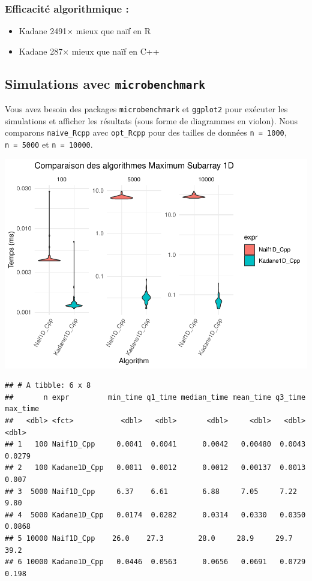 \documentclass[
]{article}
\begin{document}
\subsubsection{Efficacité algorithmique
:}\label{efficacituxe9-algorithmique}

\begin{itemize}
\item
  Kadane 2491× mieux que naïf en R\\
\item
  Kadane 287× mieux que naïf en C++
\end{itemize}

\subsection{\texorpdfstring{Simulations avec
\texttt{microbenchmark}}{Simulations avec microbenchmark}}\label{simulations-avec-microbenchmark}

Vous avez besoin des packages \texttt{microbenchmark} et
\texttt{ggplot2} pour exécuter les simulations et afficher les résultats
(sous forme de diagrammes en violon). Nous comparons
\texttt{naive\_Rcpp} avec \texttt{opt\_Rcpp} pour des tailles de données
\texttt{n\ =\ 1000}, \texttt{n\ =\ 5000} et \texttt{n\ =\ 10000}.

\includegraphics{MaxSubarray1D_files/figure-latex/benchmark-1.pdf}

\begin{verbatim}
## # A tibble: 6 x 8
##       n expr         min_time q1_time median_time mean_time q3_time max_time
##   <dbl> <fct>           <dbl>   <dbl>       <dbl>     <dbl>   <dbl>    <dbl>
## 1   100 Naif1D_Cpp     0.0041  0.0041      0.0042   0.00480  0.0043   0.0279
## 2   100 Kadane1D_Cpp   0.0011  0.0012      0.0012   0.00137  0.0013   0.007 
## 3  5000 Naif1D_Cpp     6.37    6.61        6.88     7.05     7.22     9.80  
## 4  5000 Kadane1D_Cpp   0.0174  0.0282      0.0314   0.0330   0.0350   0.0868
## 5 10000 Naif1D_Cpp    26.0    27.3        28.0     28.9     29.7     39.2   
## 6 10000 Kadane1D_Cpp   0.0446  0.0563      0.0656   0.0691   0.0729   0.198
\end{verbatim}
\end{document}
